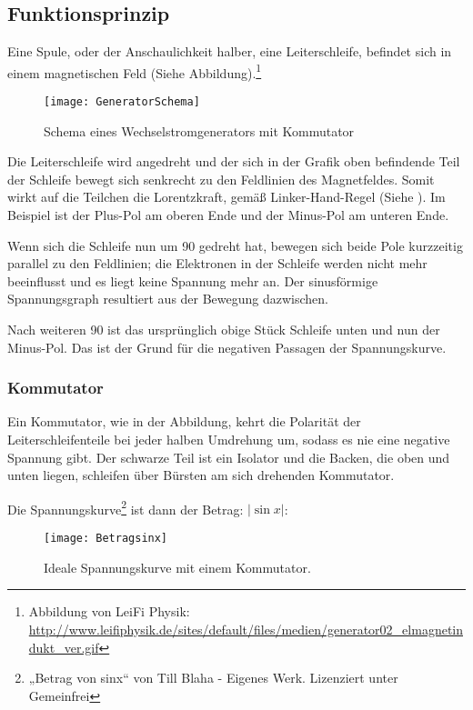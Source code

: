 \subsection{Funktionsprinzip}

Eine Spule, oder der Anschaulichkeit halber, eine Leiterschleife, befindet sich in einem magnetischen Feld (Siehe Abbildung).\footnote{Abbildung von LeiFi Physik: \url{http://www.leifiphysik.de/sites/default/files/medien/generator02_elmagnetindukt_ver.gif}}

\begin{figure}[h!]
	\centering
	\texttt{[image: GeneratorSchema]}
	\caption{Schema eines Wechselstromgenerators mit Kommutator} 
\end{figure}


Die Leiterschleife wird angedreht und der sich in der Grafik oben befindende Teil der Schleife bewegt sich senkrecht zu den Feldlinien des Magnetfeldes. Somit wirkt auf die Teilchen die Lorentzkraft, gemäß Linker-Hand-Regel (Siehe ). Im Beispiel ist der Plus-Pol am oberen Ende und der Minus-Pol am unteren Ende.

Wenn sich die Schleife nun um 90\degree{} gedreht hat, bewegen sich beide Pole kurzzeitig parallel zu den Feldlinien; die Elektronen in der Schleife werden nicht mehr beeinflusst und es liegt keine Spannung mehr an. Der sinusförmige Spannungsgraph resultiert aus der Bewegung dazwischen.

Nach weiteren 90\degree{} ist das ursprünglich obige Stück Schleife unten und nun der Minus-Pol. Das ist der Grund für die negativen Passagen der Spannungskurve.


\subsubsection{Kommutator}

Ein Kommutator, wie in der Abbildung, kehrt die Polarität der Leiterschleifenteile bei jeder halben Umdrehung um, sodass es nie eine negative Spannung gibt. Der schwarze Teil ist ein Isolator und die Backen, die oben und unten liegen, schleifen über Bürsten am sich drehenden Kommutator.

Die Spannungskurve\footnote{„Betrag von sinx“ von Till Blaha - Eigenes Werk. Lizenziert unter Gemeinfrei} ist dann der Betrag: $|\sin x|$:

\begin{figure}[h!]
	\centering
	\texttt{[image: Betragsinx]}
	\caption{Ideale Spannungskurve mit einem Kommutator.} 
\end{figure}


